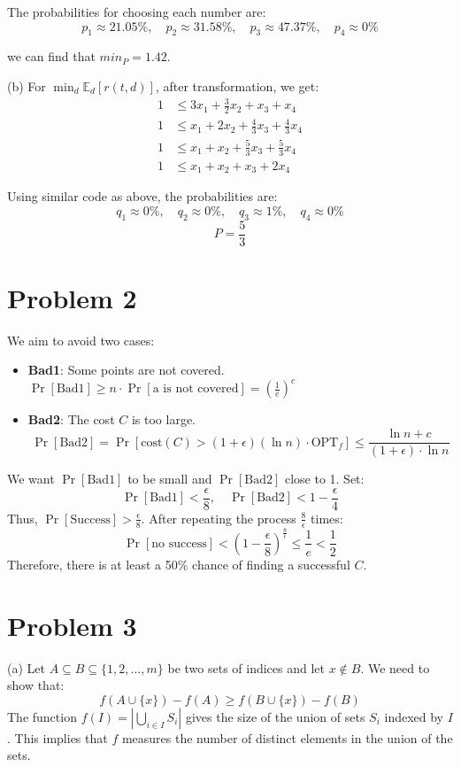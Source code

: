 \documentclass{article}
\begin{document}
The probabilities for choosing each number are:
\[
p_1 \approx 21.05\%, \quad p_2 \approx 31.58\%, \quad p_3 \approx 47.37\%, \quad p_4 \approx 0\%
\]

we can find that $min_P = 1.42$.

(b) For \( \min_d \mathbb{E}_d[r(t, d)] \), after transformation, we get:
\[
\begin{aligned}
1 &\leq 3x_1 + \frac{3}{2}x_2 + x_3 + x_4 \\
1 &\leq x_1 + 2x_2 + \frac{4}{3}x_3 + \frac{4}{3}x_4 \\
1 &\leq x_1 + x_2 + \frac{5}{3}x_3 + \frac{5}{3}x_4 \\
1 &\leq x_1 + x_2 + x_3 + 2x_4
\end{aligned}
\]

Using similar code as above, the probabilities are:
\[
q_1 \approx 0\%, \quad q_2 \approx 0\%, \quad q_3 \approx 1\%, \quad q_4 \approx 0\%
\]
\[P=\frac{5}{3}\]
\section*{Problem 2}

We aim to avoid two cases:
\begin{itemize}
    \item \textbf{Bad1}: Some points are not covered. \( \Pr[\text{Bad1}] \geq n \cdot \Pr[\text{a is not covered}] = \left(\frac{1}{e}\right)^c \)
    \item \textbf{Bad2}: The cost \( C \) is too large.
    \[
    \Pr[\text{Bad2}] = \Pr[\text{cost}(C) > (1 + \epsilon)(\ln n)\cdot \text{OPT}_f] \leq \frac{\ln n + c}{(1 + \epsilon) \cdot \ln n}
    \]
\end{itemize}

We want \( \Pr[\text{Bad1}] \) to be small and \( \Pr[\text{Bad2}] \) close to 1. Set:
\[
\Pr[\text{Bad1}] < \frac{\epsilon}{8}, \quad \Pr[\text{Bad2}] < 1 - \frac{\epsilon}{4}
\]
Thus, \( \Pr[\text{Success}] > \frac{\epsilon}{8} \). After repeating the process \( \frac{8}{\epsilon} \) times:
\[
\Pr[\text{no success}] < \left(1 - \frac{\epsilon}{8}\right)^{\frac{8}{\epsilon}} \leq \frac{1}{e} < \frac{1}{2}
\]
Therefore, there is at least a 50\% chance of finding a successful \( C \).

\section*{Problem 3}
(a) Let $A \subseteq B \subseteq \{1, 2, \dots, m\}$ be two sets of indices and let $x \notin B$. We need to show that:
\[
f(A \cup \{x\}) - f(A) \geq f(B \cup \{x\}) - f(B)
\]
The function $f(I) = \left| \bigcup_{i \in I} S_i \right|$ gives the size of the union of sets $S_i$ indexed by $I$. This implies that $f$ measures the number of distinct elements in the union of the sets.
\end{document}
